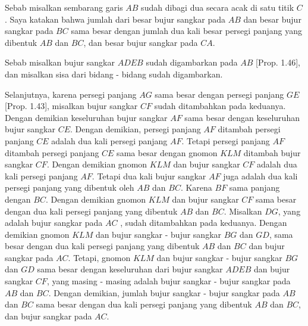 \documentclass[a4paper]{book}
\begin{document}
\begin{center}
\end{center}

Sebab misalkan sembarang garis $AB$ sudah dibagi dua secara acak di satu titik 
$C$. Saya katakan bahwa jumlah dari besar bujur sangkar pada $AB$ dan besar bujur sangkar 
pada $BC$ sama besar dengan jumlah dua kali besar persegi panjang yang dibentuk 
$AB$ dan $BC$, dan besar bujur sangkar pada $CA$.

Sebab misalkan bujur sangkar $ADEB$ sudah digambarkan pada $AB$ [Prop. 1.46], dan
misalkan sisa dari bidang - bidang sudah digambarkan.

Selanjutnya, karena persegi panjang $AG$ sama besar dengan  persegi panjang $GE$
[Prop. 1.43], misalkan bujur sangkar $CF$ sudah ditambahkan pada keduanya. Dengan
demikian keseluruhan bujur sangkar $AF$ sama besar dengan keseluruhan bujur sangkar 
$CE$. Dengan demikian, persegi panjang $AF$ ditambah persegi panjang $CE$ adalah
dua kali persegi panjang $AF$. Tetapi persegi panjang $AF$ ditambah persegi panjang
$CE$ sama besar dengan gnomon $KLM$ ditambah bujur sangkar $CF$. Dengan demikian
gnomon $KLM$ dan bujur sangkar $CF$ adalah dua kali persegi panjang $AF$. Tetapi
dua kali bujur sangkar $AF$ juga adalah dua kali persegi panjang yang dibentuk 
oleh $AB$ dan $BC$. Karena $BF$ sama panjang dengan $BC$. Dengan demikian 
gnomon $KLM$ dan bujur sangkar $CF$ sama besar dengan dua kali persegi panjang 
yang dibentuk $AB$ dan $BC$. Misalkan $DG$, yang adalah bujur sangkar pada $AC$
, sudah ditambahkan pada keduanya. Dengan demikian gnomon $KLM$ dan bujur sangkar
- bujur sangkar $BG$ dan $GD$, sama besar dengan dua kali persegi panjang yang
dibentuk $AB$ dan $BC$ dan bujur sangkar pada $AC$. Tetapi, gnomon $KLM$ dan
bujur sangkar - bujur sangkar $BG$ dan $GD$ sama besar dengan keseluruhan dari
bujur sangkar $ADEB$ dan bujur sangkar $CF$, yang masing - masing adalah bujur 
sangkar - bujur sangkar pada $AB$ dan $BC$. Dengan demikian, jumlah 
bujur sangkar - bujur sangkar pada $AB$ dan $BC$ sama besar dengan dua kali
persegi panjang yang dibentuk $AB$ dan $BC$, dan bujur sangkar pada
$AC$.
\end{document}
